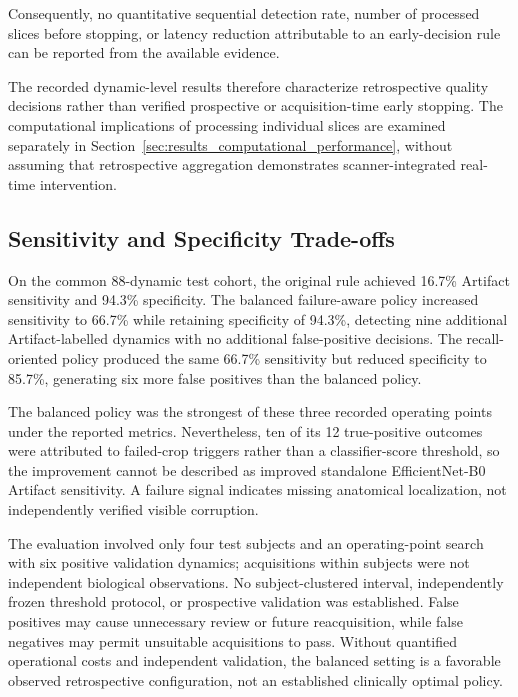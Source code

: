 Consequently, no quantitative sequential detection rate, number of processed slices before stopping, or latency reduction attributable to an early-decision rule can be reported from the available evidence.

The recorded dynamic-level results therefore characterize retrospective quality decisions rather than verified prospective or acquisition-time early stopping. The computational implications of processing individual slices are examined separately in Section~\ref{sec:results_computational_performance}, without assuming that retrospective aggregation demonstrates scanner-integrated real-time intervention.

\subsection{Sensitivity and Specificity Trade-offs}
\label{subsec:results_dynamic_tradeoffs}

On the common 88-dynamic test cohort, the original rule achieved 16.7\% Artifact sensitivity and 94.3\% specificity. The balanced failure-aware policy increased sensitivity to 66.7\% while retaining specificity of 94.3\%, detecting nine additional Artifact-labelled dynamics with no additional false-positive decisions. The recall-oriented policy produced the same 66.7\% sensitivity but reduced specificity to 85.7\%, generating six more false positives than the balanced policy.

The balanced policy was the strongest of these three recorded operating points under the reported metrics. Nevertheless, ten of its 12 true-positive outcomes were attributed to failed-crop triggers rather than a classifier-score threshold, so the improvement cannot be described as improved standalone EfficientNet-B0 Artifact sensitivity. A failure signal indicates missing anatomical localization, not independently verified visible corruption.

The evaluation involved only four test subjects and an operating-point search with six positive validation dynamics; acquisitions within subjects were not independent biological observations. No subject-clustered interval, independently frozen threshold protocol, or prospective validation was established. False positives may cause unnecessary review or future reacquisition, while false negatives may permit unsuitable acquisitions to pass. Without quantified operational costs and independent validation, the balanced setting is a favorable observed retrospective configuration, not an established clinically optimal policy.

